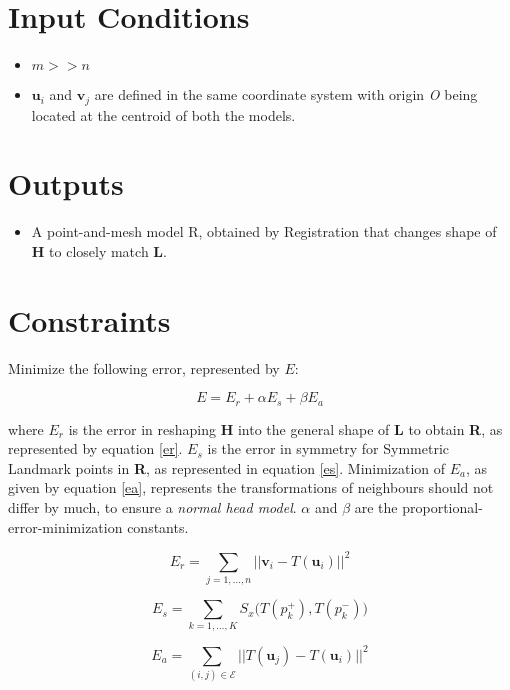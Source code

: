 \documentclass[12pt,a4paper]{article}
\begin{document}
\section*{Input Conditions}

\begin{itemize}
    \item $m>>n$
    \item $\textbf{u}_i$ and $\textbf{v}_j$ are defined in the same coordinate system with origin \textit{O} being located at the centroid of both the models.
\end{itemize}

\section*{Outputs}

\begin{itemize}
    \item A point-and-mesh model R, obtained by Registration that changes shape of \textbf{H} to closely match \textbf{L}.
\end{itemize}

\section*{Constraints}
Minimize the following error, represented by $E$:

\begin{equation}
    E= E_r + \alpha E_s + \beta E_a
\end{equation}

\noindent where $E_r$ is the error in reshaping \textbf{H} into the general shape of \textbf{L} to obtain \textbf{R}, as represented by equation \ref{er}. $E_s$ is the error in symmetry for Symmetric Landmark points in \textbf{R}, as represented in equation \ref{es}. Minimization of $E_a$, as given by equation \ref{ea}, represents the transformations of neighbours should not differ by much, to ensure a \textit{normal head model}. $\alpha$ and $\beta$ are the proportional-error-minimization constants.

\begin{equation}\label{er}
E_r = \sum_{j=1,\dots,n}{||\textbf{v}_i - T(\textbf{u}_i)||^2}
\end{equation}


\begin{equation}\label{es}
E_s = \sum_{k=1,\dots,K}{S_x\Big(T(p_k^+), T(p_k^-)\Big)}
\end{equation}


\begin{equation}\label{ea}
E_a = \sum_{(i,j) \in \mathcal{E}}{||T(\textbf{u}_j) - T(\textbf{u}_i)||^2}
\end{equation}
\end{document}
